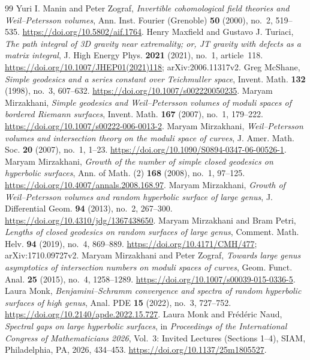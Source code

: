 \begin{thebibliography}{99}
 Yuri I. Manin and Peter Zograf, \emph{Invertible cohomological field theories and Weil--Petersson volumes}, Ann. Inst. Fourier (Grenoble) \textbf{50} (2000), no.~2, 519--535. \url{https://doi.org/10.5802/aif.1764}.
 Henry Maxfield and Gustavo J. Turiaci, \emph{The path integral of 3D gravity near extremality; or, JT gravity with defects as a matrix integral}, J. High Energy Phys. \textbf{2021} (2021), no.~1, article~118. \url{https://doi.org/10.1007/JHEP01(2021)118}; arXiv:2006.11317v2.
 Greg McShane, \emph{Simple geodesics and a series constant over Teichmuller space}, Invent. Math. \textbf{132} (1998), no.~3, 607--632. \url{https://doi.org/10.1007/s002220050235}.
 Maryam Mirzakhani, \emph{Simple geodesics and Weil--Petersson volumes of moduli spaces of bordered Riemann surfaces}, Invent. Math. \textbf{167} (2007), no.~1, 179--222. \url{https://doi.org/10.1007/s00222-006-0013-2}.
 Maryam Mirzakhani, \emph{Weil--Petersson volumes and intersection theory on the moduli space of curves}, J. Amer. Math. Soc. \textbf{20} (2007), no.~1, 1--23. \url{https://doi.org/10.1090/S0894-0347-06-00526-1}.
 Maryam Mirzakhani, \emph{Growth of the number of simple closed geodesics on hyperbolic surfaces}, Ann. of Math. (2) \textbf{168} (2008), no.~1, 97--125. \url{https://doi.org/10.4007/annals.2008.168.97}.
 Maryam Mirzakhani, \emph{Growth of Weil--Petersson volumes and random hyperbolic surface of large genus}, J. Differential Geom. \textbf{94} (2013), no.~2, 267--300. \url{https://doi.org/10.4310/jdg/1367438650}.
 Maryam Mirzakhani and Bram Petri, \emph{Lengths of closed geodesics on random surfaces of large genus}, Comment. Math. Helv. \textbf{94} (2019), no.~4, 869--889. \url{https://doi.org/10.4171/CMH/477}; arXiv:1710.09727v2.
 Maryam Mirzakhani and Peter Zograf, \emph{Towards large genus asymptotics of intersection numbers on moduli spaces of curves}, Geom. Funct. Anal. \textbf{25} (2015), no.~4, 1258--1289. \url{https://doi.org/10.1007/s00039-015-0336-5}.
 Laura Monk, \emph{Benjamini--Schramm convergence and spectra of random hyperbolic surfaces of high genus}, Anal. PDE \textbf{15} (2022), no.~3, 727--752. \url{https://doi.org/10.2140/apde.2022.15.727}.
 Laura Monk and Fr\'ed\'eric Naud, \emph{Spectral gaps on large hyperbolic surfaces}, in \emph{Proceedings of the International Congress of Mathematicians 2026}, Vol.~3: Invited Lectures (Sections 1--4), SIAM, Philadelphia, PA, 2026, 434--453. \url{https://doi.org/10.1137/25m1805527}.

\end{thebibliography}
